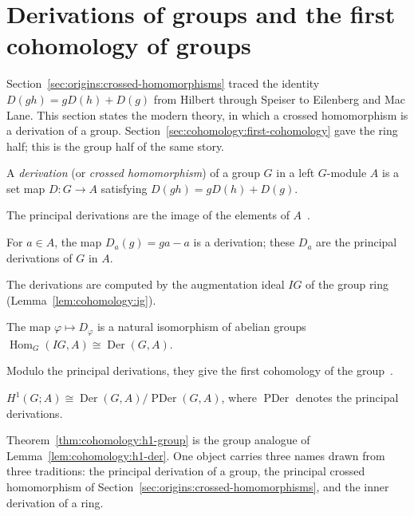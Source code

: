 \section{Derivations of groups and the first cohomology of groups}\label{sec:cohomology:group-cohomology}

Section~\ref{sec:origins:crossed-homomorphisms} traced the identity $D(gh) =
gD(h) + D(g)$ from Hilbert through Speiser to Eilenberg and Mac Lane. This
section states the modern theory, in which a crossed homomorphism is a
derivation of a group. Section~\ref{sec:cohomology:first-cohomology} gave the
ring half; this is the group half of the same story.

\begin{definition}\label{def:cohomology:group-derivation}
A \emph{derivation} (or \emph{crossed homomorphism}) of a group $G$ in a left
$G$-module $A$ is a set map $D \colon G \to A$ satisfying
$D(gh) = gD(h) + D(g)$.
\end{definition}

The principal derivations are the image of the elements of
$A$~\cite[Example~6.4.2, p.~174]{Weibel1994}.

\begin{example}\label{ex:cohomology:principal}
For $a \in A$, the map $D_a(g) = ga - a$ is a derivation; these $D_a$ are the
principal derivations of $G$ in $A$.
\end{example}

The derivations are computed by the augmentation ideal $IG$ of the group
ring~ (Lemma~\ref{lem:cohomology:ig})\cite[Lemma~6.4.4, p.~175]{Weibel1994}.

\begin{lemma}\label{lem:cohomology:ig}
The map $\varphi \mapsto D_\varphi$ is a natural isomorphism of abelian groups
$\operatorname{Hom}_G(IG, A) \cong \operatorname{Der}(G, A)$.
\end{lemma}

Modulo the principal derivations, they give the first cohomology of the
group~\cite[Theorem~6.4.5, p.~175]{Weibel1994}.

\begin{theorem}\label{thm:cohomology:h1-group}
$H^1(G; A) \cong \operatorname{Der}(G, A)/\operatorname{PDer}(G, A)$,
where $\operatorname{PDer}$ denotes the principal derivations.
\end{theorem}

Theorem~\ref{thm:cohomology:h1-group} is the group analogue of
Lemma~\ref{lem:cohomology:h1-der}. One object carries three names drawn from
three traditions: the principal derivation of a group, the principal crossed
homomorphism of Section~\ref{sec:origins:crossed-homomorphisms}, and the inner
derivation of a ring.
